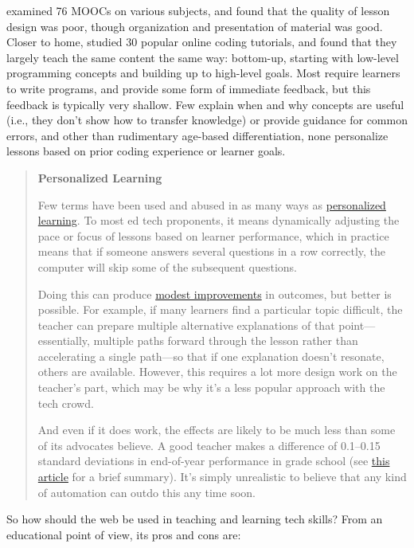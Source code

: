 \cite{Marg2015} examined 76 MOOCs on various subjects, and found that
the quality of lesson design was poor, though organization and
presentation of material was good. Closer to home, \cite{Kim2017}
studied 30 popular online coding tutorials, and found that they largely
teach the same content the same way: bottom-up, starting with low-level
programming concepts and building up to high-level goals. Most require
learners to write programs, and provide some form of immediate feedback,
but this feedback is typically very shallow. Few explain when and why
concepts are useful (i.e., they don't show how to transfer knowledge) or
provide guidance for common errors, and other than rudimentary age-based
differentiation, none personalize lessons based on prior coding
experience or learner goals.

\begin{quote}\setlength{\parindent}{0pt}
\textbf{Personalized Learning}

Few terms have been used and abused in as many ways as
\protect\hyperlink{g:personalized-learning}{personalized learning}. To most
ed tech proponents, it means dynamically adjusting the pace or focus
of lessons based on learner performance, which in practice means that
if someone answers several questions in a row correctly, the computer
will skip some of the subsequent questions.

Doing this can produce \href{https://www.rand.org/pubs/research_briefs/RB9994.html}{modest
improvements} in outcomes, but
better is possible. For example, if many learners find a particular
topic difficult, the teacher can prepare multiple alternative
explanations of that point---essentially, multiple paths forward
through the lesson rather than accelerating a single path---so that
if one explanation doesn't resonate, others are available. However,
this requires a lot more design work on the teacher's part, which
may be why it's a less popular approach with the tech crowd.

And even if it does work, the effects are likely to be much less
than some of its advocates believe. A good teacher makes a
difference of 0.1--0.15 standard deviations in end-of-year
performance in grade school \cite{Chet2014} (see \href{http://educationnext.org/in-schools-teacher-quality-matters-most-coleman/}{this
article} for a brief summary). It's simply
unrealistic to believe that any kind of automation can outdo this
any time soon.
\end{quote}

So how should the web be used in teaching and learning tech skills? From
an educational point of view, its pros and cons are:


